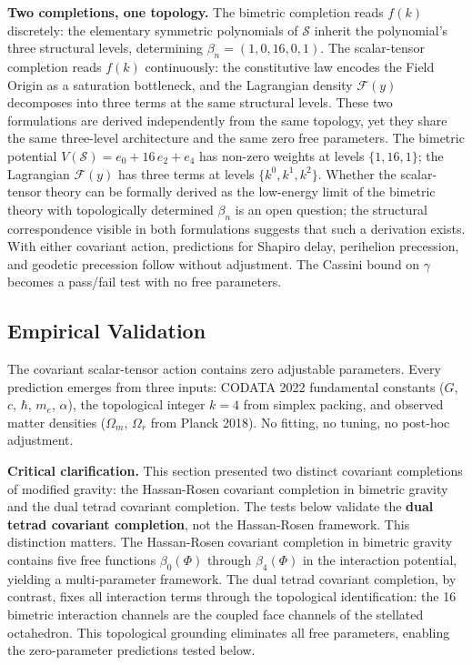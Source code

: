\documentclass[aps,prd,preprint,superscriptaddress,showpacs,preprintnumbers,amsmath,amssymb,nofootinbib]{revtex4-2}
\begin{document}
\textbf{Two completions, one topology.} The bimetric completion reads $f(k)$ discretely: the elementary symmetric polynomials of $\mathcal{S}$ inherit the polynomial's three structural levels, determining $\beta_n = (1, 0, 16, 0, 1)$. The scalar-tensor completion reads $f(k)$ continuously: the constitutive law encodes the Field Origin as a saturation bottleneck, and the Lagrangian density $\mathcal{F}(y)$ decomposes into three terms at the same structural levels. These two formulations are derived independently from the same topology, yet they share the same three-level architecture and the same zero free parameters. The bimetric potential $V(\mathcal{S}) = e_0 + 16\,e_2 + e_4$ has non-zero weights at levels $\{1, 16, 1\}$; the Lagrangian $\mathcal{F}(y)$ has three terms at levels $\{k^0, k^1, k^2\}$. Whether the scalar-tensor theory can be formally derived as the low-energy limit of the bimetric theory with topologically determined $\beta_n$ is an open question; the structural correspondence visible in both formulations suggests that such a derivation exists. With either covariant action, predictions for Shapiro delay, perihelion precession, and geodetic precession follow without adjustment. The Cassini bound on $\gamma$ becomes a pass/fail test with no free parameters.

\subsection{Empirical Validation}
\label{subsec:empirical_validation}

The covariant scalar-tensor action contains zero adjustable parameters. Every prediction emerges from three inputs: CODATA 2022 fundamental constants ($G$, $c$, $\hbar$, $m_e$, $\alpha$), the topological integer $k = 4$ from simplex packing, and observed matter densities ($\Omega_m$, $\Omega_r$ from Planck 2018). No fitting, no tuning, no post-hoc adjustment.

\textbf{Critical clarification.} This section presented two distinct covariant completions of modified gravity: the Hassan-Rosen covariant completion in bimetric gravity~\cite{hassan2012} and the dual tetrad covariant completion. The tests below validate the \textbf{dual tetrad covariant completion}, not the Hassan-Rosen framework. This distinction matters. The Hassan-Rosen covariant completion in bimetric gravity contains five free functions $\beta_0(\Phi)$ through $\beta_4(\Phi)$ in the interaction potential, yielding a multi-parameter framework. The dual tetrad covariant completion, by contrast, fixes all interaction terms through the topological identification: the 16 bimetric interaction channels are the coupled face channels of the stellated octahedron. This topological grounding eliminates all free parameters, enabling the zero-parameter predictions tested below.
\end{document}
